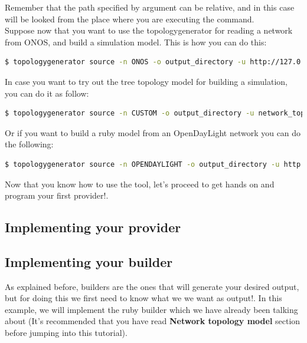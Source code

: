 Remember that the path specified by argument can be relative, and in this case will be looked from the place where you are executing the command.\\

Suppose now that you want to use the topologygenerator for reading a network from ONOS, and build a simulation model. This is how you can do this:

\begin{lstlisting}[language=bash,breaklines=true]
$ topologygenerator source -n ONOS -o output_directory -u http://127.0.0.1/onos/v1/ -d builders_examples/pdm_builders
\end{lstlisting}

In case you want to try out the tree topology model for building a simulation, you can do it as follow:

\begin{lstlisting}[language=bash,breaklines=true]
$ topologygenerator source -n CUSTOM -o output_directory -u network_topologies_examples/tree_topology.rb -d builders_examples/pdm_builders
\end{lstlisting}

Or if you want to build a ruby model from an OpenDayLight network you can do the following:

\begin{lstlisting}[language=bash,breaklines=true]
$ topologygenerator source -n OPENDAYLIGHT -o output_directory -u http://localhost:8080/restconf/operational/network-topology:network-topology/topology/flow:1/ -d builders_examples/ruby_builders
\end{lstlisting}

Now that you know how to use the tool, let's proceed to get hands on and program your first provider!.

\subsection{Implementing your provider}




\subsection{Implementing your builder}

As explained before, builders are the ones that will generate your desired output, but for doing this we first need to know what we we want as output!. In this example, we will implement the ruby builder which we have already been talking about (It's recommended that you have read \textbf{Network topology model} section before jumping into this tutorial). \\

